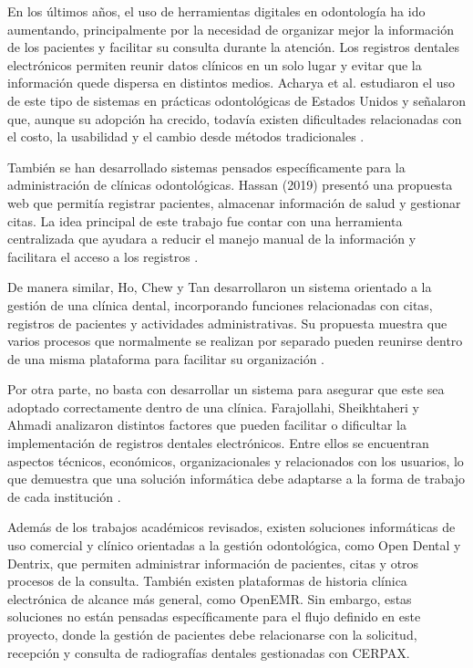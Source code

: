 	En los últimos años, el uso de herramientas digitales en odontología ha
	ido aumentando, principalmente por la necesidad de organizar mejor la
	información de los pacientes y facilitar su consulta durante la atención.
	Los registros dentales electrónicos permiten reunir datos clínicos en un
	solo lugar y evitar que la información quede dispersa en distintos medios.
	Acharya et al. estudiaron el uso de este tipo de sistemas en prácticas
	odontológicas de Estados Unidos y señalaron que, aunque su adopción ha
	crecido, todavía existen dificultades relacionadas con el costo, la
	usabilidad y el cambio desde métodos tradicionales
	\parencite{acharya2017}.
	
	También se han desarrollado sistemas pensados específicamente para la
	administración de clínicas odontológicas. Hassan (2019) presentó una
	propuesta web que permitía registrar pacientes, almacenar información de
	salud y gestionar citas. La idea principal de este trabajo fue contar con
	una herramienta centralizada que ayudara a reducir el manejo manual de la
	información y facilitara el acceso a los registros
	\parencite{hassan2019}.
	
	De manera similar, Ho, Chew y Tan desarrollaron un sistema orientado a la
	gestión de una clínica dental, incorporando funciones relacionadas con
	citas, registros de pacientes y actividades administrativas. Su propuesta
	muestra que varios procesos que normalmente se realizan por separado pueden
	reunirse dentro de una misma plataforma para facilitar su organización
	\parencite{ho2024}.
	
	Por otra parte, no basta con desarrollar un sistema para asegurar que este
	sea adoptado correctamente dentro de una clínica. Farajollahi, Sheikhtaheri
	y Ahmadi analizaron distintos factores que pueden facilitar o dificultar la
	implementación de registros dentales electrónicos. Entre ellos se encuentran
	aspectos técnicos, económicos, organizacionales y relacionados con los
	usuarios, lo que demuestra que una solución informática debe adaptarse a la
	forma de trabajo de cada institución
	\parencite{farajollahi2024}.
	
	Además de los trabajos académicos revisados, existen soluciones
	informáticas de uso comercial y clínico orientadas a la gestión
	odontológica, como Open Dental y Dentrix, que permiten administrar
	información de pacientes, citas y otros procesos de la consulta.
	También existen plataformas de historia clínica electrónica de alcance
	más general, como OpenEMR. Sin embargo, estas soluciones no están
	pensadas específicamente para el flujo definido en este proyecto, donde
	la gestión de pacientes debe relacionarse con la solicitud, recepción y
	consulta de radiografías dentales gestionadas con CERPAX.
	
